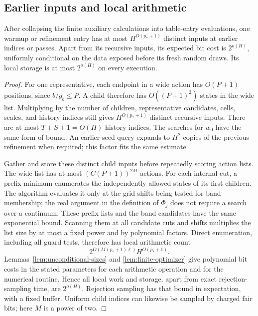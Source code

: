 \subsection{Earlier inputs and local arithmetic}

\begin{lemma}
\label{lem:local-work}
After collapsing the finite auxiliary calculations into table-entry
evaluations, one warmup or refinement entry has at most
$H^{O(p_*+1)}$ distinct inputs
at earlier indices or passes.  Apart from its recursive inputs,
its expected bit cost is $2^{o(H)}$, uniformly conditional on the
data exposed before its fresh random draws.  Its local storage is
at most $2^{o(H)}$ on every execution.
\end{lemma}

\begin{proof}
For one representative, each endpoint in a wide action has
$O(P+1)$ positions, since $b/g_b\le P$.  A child therefore has
$O((P+1)^2)$ states in the wide list.  Multiplying by the number
of children, representative candidates, cells, scales, and history
indices still gives $H^{O(p_*+1)}$ distinct recursive inputs.
There are at most $T+S+1=O(H)$ history indices.  The searches for
$w_0$ have the same form of bound.  An earlier seed query expands
to $H^2$ copies of the previous refinement when required; this
factor fits the same estimate.

Gather and store these distinct child inputs before repeatedly
scoring action lists.  The wide list has at most
$(C(P+1))^{2M}$ actions.  For each internal cut, a prefix minimum
enumerates the independently allowed states of its first children.
The algorithm evaluates it only at the grid shifts being tested for
band membership; the real argument in the definition of $\Phi_j$
does not require a search over a continuum.  These prefix lists and
the band candidates have the same exponential bound.  Scanning them
at all candidate cuts and shifts multiplies the list size by at most
a fixed power and by polynomial factors.  Direct enumeration,
including all guard tests, therefore has local arithmetic count
\[
 2^{O(M(p_*+1)\ell)}H^{O(p_*+1)}.
\]
Lemmas~\ref{lem:unconditional-sizes} and
\ref{lem:finite-optimizer} give polynomial bit costs in the stated
parameters for each arithmetic operation and for the numerical
routine.  Hence all local work and storage, apart from exact
rejection-sampling time, are $2^{o(H)}$.  Rejection sampling has
that bound in expectation, with a fixed buffer.  Uniform child
indices can likewise be sampled by charged fair bits; here $M$
is a power of two.


\end{proof}
